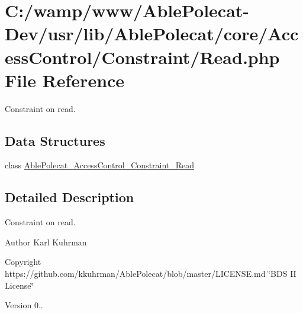 \hypertarget{_read_8php}{}\section{C\+:/wamp/www/\+Able\+Polecat-\/\+Dev/usr/lib/\+Able\+Polecat/core/\+Access\+Control/\+Constraint/\+Read.php File Reference}
\label{_read_8php}


Constraint on read.  


\subsection*{Data Structures}
\begin{DoxyCompactItemize}
\item 
class \hyperlink{class_able_polecat___access_control___constraint___read}{Able\+Polecat\+\_\+\+Access\+Control\+\_\+\+Constraint\+\_\+\+Read}
\end{DoxyCompactItemize}


\subsection{Detailed Description}
Constraint on read. 

\begin{DoxyAuthor}{Author}
Karl Kuhrman 
\end{DoxyAuthor}
\begin{DoxyCopyright}{Copyright}
https\+://github.com/kkuhrman/\+Able\+Polecat/blob/master/\+L\+I\+C\+E\+N\+S\+E.\+md \char`\"{}\+B\+D\+S I\+I License\char`\"{} 
\end{DoxyCopyright}
\begin{DoxyVersion}{Version}
0.. 
\end{DoxyVersion}
